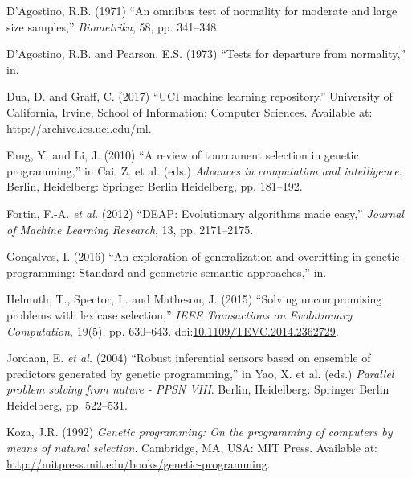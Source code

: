 \documentclass[
  12pt,
]{article}
\newlength{\cslhangindent}
\newlength{\cslentryspacingunit} %
\newenvironment{CSLReferences}[2] %
 {%
  \setlength{\parindent}{0pt}
  \ifodd #1
  \let\oldpar\par
  \def\par{\hangindent=\cslhangindent\oldpar}
  \fi
  \setlength{\parskip}{#2\cslentryspacingunit}
 }%
 {}
\begin{document}
\hypertarget{refs}{}
\begin{CSLReferences}{0}{0}
\leavevmode{}%
D'Agostino, R.B. (1971) {``An omnibus test of normality for moderate and
large size samples,''} \emph{Biometrika}, 58, pp. 341--348.

\leavevmode{}%
D'Agostino, R.B. and Pearson, E.S. (1973) {``Tests for departure from
normality,''} in.

\leavevmode{}%
Dua, D. and Graff, C. (2017) {``{UCI} machine learning repository.''}
University of California, Irvine, School of Information; Computer
Sciences. Available at: \url{http://archive.ics.uci.edu/ml}.

\leavevmode{}%
Fang, Y. and Li, J. (2010) {``A review of tournament selection in
genetic programming,''} in Cai, Z. et al. (eds.) \emph{Advances in
computation and intelligence}. Berlin, Heidelberg: Springer Berlin
Heidelberg, pp. 181--192.

\leavevmode{}%
Fortin, F.-A. \emph{et al.} (2012) {``{DEAP}: Evolutionary algorithms
made easy,''} \emph{Journal of Machine Learning Research}, 13, pp.
2171--2175.

\leavevmode{}%
Gonçalves, I. (2016) {``An exploration of generalization and overfitting
in genetic programming: Standard and geometric semantic approaches,''}
in.

\leavevmode{}%
Helmuth, T., Spector, L. and Matheson, J. (2015) {``Solving
uncompromising problems with lexicase selection,''} \emph{IEEE
Transactions on Evolutionary Computation}, 19(5), pp. 630--643.
doi:\href{https://doi.org/10.1109/TEVC.2014.2362729}{10.1109/TEVC.2014.2362729}.

\leavevmode{}%
Jordaan, E. \emph{et al.} (2004) {``Robust inferential sensors based on
ensemble of predictors generated by genetic programming,''} in Yao, X.
et al. (eds.) \emph{Parallel problem solving from nature - PPSN VIII}.
Berlin, Heidelberg: Springer Berlin Heidelberg, pp. 522--531.

\leavevmode{}%
Koza, J.R. (1992) \emph{Genetic programming: On the programming of
computers by means of natural selection}. Cambridge, MA, USA: MIT Press.
Available at: \url{http://mitpress.mit.edu/books/genetic-programming}.


\end{CSLReferences}
\end{document}
